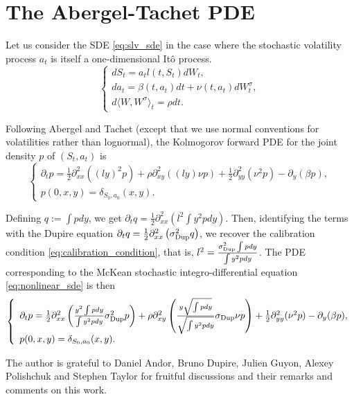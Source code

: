 \documentclass[a4paper]{article}
\newcommand{\1}{\textbf{1}}
\begin{document}
\section{The Abergel-Tachet PDE}\label{sec:abergel_tachet}
\par Let us consider the SDE \eqref{eq:slv_sde} in the case where the stochastic volatility process $a_t$ is itself a one-dimensional It\^o process. 
$$
\left\{\begin{array}{ll} dS_t = a_t l(t, S_t)dW_t,\\
da_t = \beta(t,a_t)dt + \nu(t,a_t) dW_t^\sigma,\\
d\langle W, W^\sigma \rangle_t = \rho dt.
\end{array}\right.
$$
\par \noindent Following Abergel and Tachet \cite{AbergelTachet} (except that we use normal conventions for volatilities rather than lognormal), the Kolmogorov forward PDE for the joint density $p$ of $(S_t, a_t)$ is
$$
\left\{\begin{array}{l}
\partial_t p = \frac{1}{2}\partial^2_{xx} ((l y)^2 p) + \rho \partial^2_{xy} ((ly) \nu p) + \frac{1}{2} \partial^2_{yy} (\nu^2 p) - \partial_y (\beta p),\\
p(0,x,y) = \delta_{S_0, a_0}(x,y).
\end{array}\right.
$$
\par \noindent Defining $q:=\int p dy$, we get $\partial_t q = \frac{1}{2} \partial^2_{xx} \left( l^2 \int y^2 p dy \right)$. Then, identifying the terms with the Dupire equation $\partial_t q = \frac{1}{2} \partial^2_{xx} \left( \sigma_{\textnormal{Dup}}^2 q \right)$, we recover the calibration condition \eqref{eq:calibration_condition}, that is, $l^2 = \frac{\sigma_{\textnormal{Dup}}^2 \int p dy}{\int y^2 p dy}$. The PDE corresponding to the McKean stochastic integro-differential equation \eqref{eq:nonlinear_sde} is then 
$$
\left\{\begin{array}{l}
\partial_t p = \frac{1}{2}\partial^2_{xx} \left(\frac{y^2 \int p dy}{\int y^2 p dy} \sigma_{\textnormal{Dup}}^2 p \right) + \rho \partial^2_{xy} \left(\frac{y \sqrt{\int p dy}}{\sqrt{\int y^2 p dy}} \sigma_{\textnormal{Dup}} \nu p\right) + \frac{1}{2} \partial^2_{yy} (\nu^2 p) - \partial_y (\beta p),\\
p(0,x,y) = \delta_{S_0, a_0}(x,y).
\end{array}\right.
$$

\vspace{6mm}
\par \noindent The author is grateful to Daniel Andor, Bruno Dupire, Julien Guyon, Alexey Polishchuk and Stephen Taylor for fruitful discussions and their remarks and comments on this work.

\end{document}

